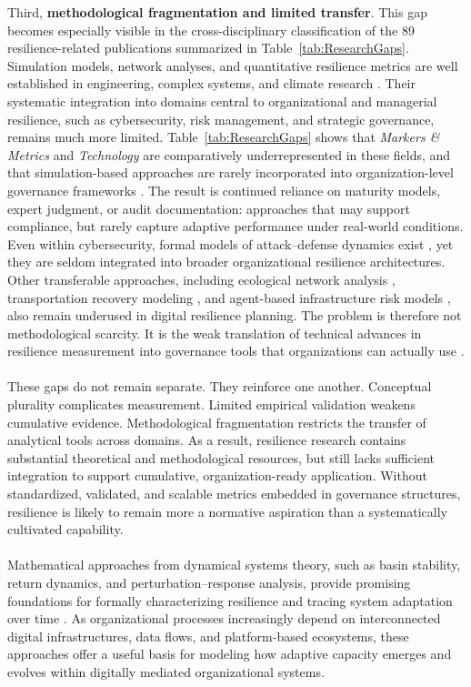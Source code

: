 Third, \textbf{methodological fragmentation and limited transfer}. This gap becomes especially visible in the cross-disciplinary classification of the 89 resilience-related publications summarized in Table~\ref{tab:ResearchGaps}. Simulation models, network analyses, and quantitative resilience metrics are well established in engineering, complex systems, and climate research \autocite{francis2014metric}. Their systematic integration into domains central to organizational and managerial resilience, such as cybersecurity, risk management, and strategic governance, remains much more limited. Table~\ref{tab:ResearchGaps} shows that \textit{Markers \& Metrics} and \textit{Technology} are comparatively underrepresented in these fields, and that simulation-based approaches are rarely incorporated into organization-level governance frameworks \autocite{linkov2013resilience,kuypers2018designing}. The result is continued reliance on maturity models, expert judgment, or audit documentation: approaches that may support compliance, but rarely capture adaptive performance under real-world conditions.\\

Even within cybersecurity, formal models of attack--defense dynamics exist \autocite{aydin2018integration}, yet they are seldom integrated into broader organizational resilience architectures. Other transferable approaches, including ecological network analysis \autocite{luke2012systems}, transportation recovery modeling \autocite{jacobs2017applying}, and agent-based infrastructure risk models \autocite{dawson2011agentbased}, also remain underused in digital resilience planning. The problem is therefore not methodological scarcity. It is the weak translation of technical advances in resilience measurement into governance tools that organizations can actually use \autocite{heinimann2017infrastructure,aerts2018integrating}.\\
\\
These gaps do not remain separate. They reinforce one another. Conceptual plurality complicates measurement. Limited empirical validation weakens cumulative evidence. Methodological fragmentation restricts the transfer of analytical tools across domains. As a result, resilience research contains substantial theoretical and methodological resources, but still lacks sufficient integration to support cumulative, organization-ready application. Without standardized, validated, and scalable metrics embedded in governance structures, resilience is likely to remain more a normative aspiration than a systematically cultivated capability.\\
\\
Mathematical approaches from dynamical systems theory, such as basin stability, return dynamics, and perturbation--response analysis, provide promising foundations for formally characterizing resilience and tracing system adaptation over time \autocite{krakovska2024resilience}. As organizational processes increasingly depend on interconnected digital infrastructures, data flows, and platform-based ecosystems, these approaches offer a useful basis for modeling how adaptive capacity emerges and evolves within digitally mediated organizational systems.

